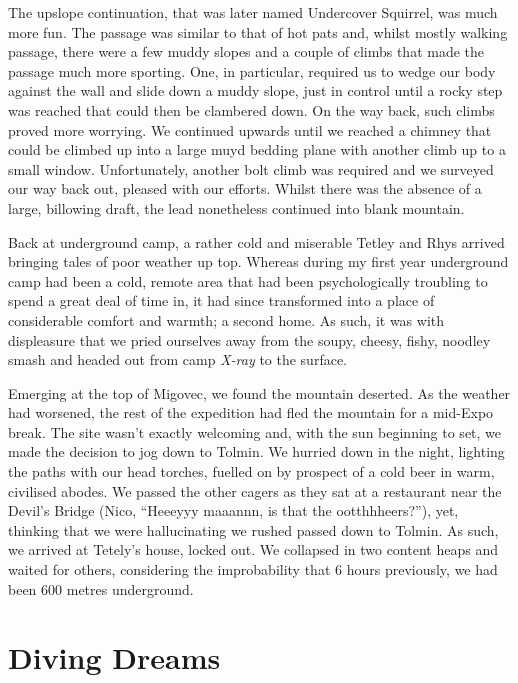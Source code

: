 The upslope continuation, that was later named Undercover Squirrel, was
much more fun. The passage was similar to that of hot pats and, whilst
mostly walking passage, there were a few muddy slopes and a couple of
climbs that made the passage much more sporting. One, in particular,
required us to wedge our body against the wall and slide down a muddy
slope, just in control until a rocky step was reached that could then be
clambered down. On the way back, such climbs proved more worrying. We
continued upwards until we reached a chimney that could be climbed up
into a large muyd bedding plane with another climb up to a small window.
Unfortunately, another bolt climb was required and we surveyed our way
back out, pleased with our efforts. Whilst there was the absence of a
large, billowing draft, the lead nonetheless continued into blank
mountain.

Back at underground camp, a rather cold and miserable Tetley and Rhys
arrived bringing tales of poor weather up top. Whereas during my first
year underground camp had been a cold, remote area that had been
psychologically troubling to spend a great deal of time in, it had since
transformed into a place of considerable comfort and warmth; a second
home. As such, it was with displeasure that we pried ourselves away from
the soupy, cheesy, fishy, noodley smash and headed out from camp
\emph{X-ray} to the surface.

Emerging at the top of Migovec, we found the mountain deserted. As the
weather had worsened, the rest of the expedition had fled the mountain
for a mid-Expo break. The site wasn't exactly welcoming and, with the
sun beginning to set, we made the decision to jog down to Tolmin. We
hurried down in the night, lighting the paths with our head torches,
fuelled on by prospect of a cold beer in warm, civilised abodes. We
passed the other cagers as they sat at a restaurant near the Devil's
Bridge (Nico, ``Heeeyyy maaannn, is that the ootthhheers?''), yet,
thinking that we were hallucinating we rushed passed down to Tolmin. As
such, we arrived at Tetely's house, locked out. We collapsed in two
content heaps and waited for others, considering the improbability that
6 hours previously, we had been 600 metres underground.


\hypertarget{diving-dreams}{%
\section{Diving Dreams}\label{diving-dreams}}

